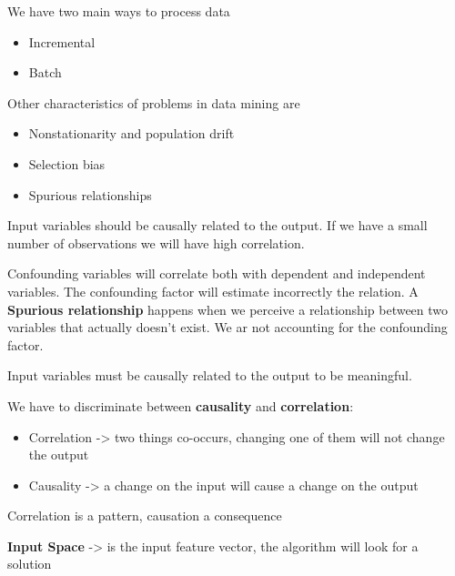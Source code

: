 \vspace{10pt}


We have two main ways to process data

\begin{itemize}
    \item Incremental
    \item Batch
\end{itemize}

Other characteristics of problems in data mining are

\begin{itemize}
    \item Nonstationarity and population drift
    \item Selection bias
    \item Spurious relationships
\end{itemize}


\vspace{10pt}

Input variables should be causally related to the output. If we have a small number of observations we will have high correlation.

Confounding variables will correlate both with dependent and independent variables. The confounding factor will estimate incorrectly the relation. A \textbf{Spurious relationship} happens when we perceive a relationship between two variables that actually doesn't exist. We ar not accounting for the confounding factor. 

\vspace{10pt}

Input variables must be causally related to the output to be meaningful.

\vspace{10pt}

We have to discriminate between \textbf{causality} and \textbf{correlation}:
\begin{itemize}
    \item Correlation -> two things co-occurs, changing one of them will not change the output
    \item Causality -> a change on the input will cause a change on the output
\end{itemize}

Correlation is a pattern, causation a consequence


\vspace{10pt}

\textbf{Input Space} -> is the input feature vector, the algorithm will look for a solution

